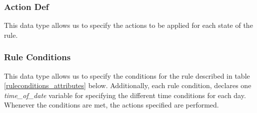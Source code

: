 \subsubsection{Action Def}
\noindent
This data type allows us to specify the actions to be applied for each state of the rule. 

\begin{table}[H]
\begin{center}
\end{center}
\caption{\emph{Action{\_}Def} Attribute definitions. }
\label{actiondef_attributes}
\end{table}

\subsubsection{Rule Conditions}
\noindent
This data type allows us to specify the conditions for the rule described in table \ref{ruleconditions_attributes} below. Additionally, each rule condition, declares one \emph{time{\_}of{\_}date} variable for specifying the different time conditions for each day. Whenever the conditions are met, the actions specified are performed. \\

